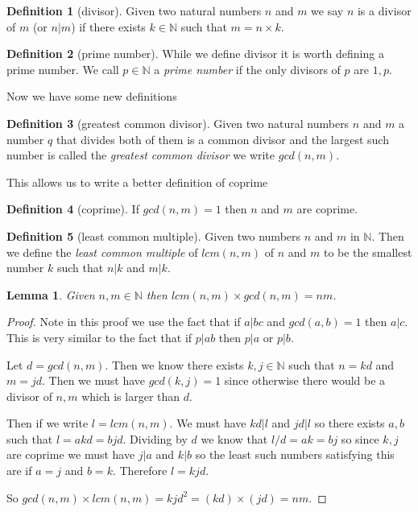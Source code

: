 \documentclass[
]{book}
\newtheorem{lemma}{Lemma}[chapter]
\theoremstyle{definition}
\newtheorem{definition}{Definition}[chapter]
\theoremstyle{definition}
\theoremstyle{definition}
\theoremstyle{definition}
\theoremstyle{remark}
\begin{document}
\begin{definition}[divisor]
Given two natural numbers \(n\) and \(m\) we say \(n\) is a divisor of \(m\) (or \(n|m\)) if there exists \(k \in \mathbb{N}\) such that \(m=n\times k\).
\end{definition}

\begin{definition}[prime number]
While we define divisor it is worth defining a prime number. We call \(p \in \mathbb{N}\) a \emph{prime number} if the only divisors of \(p\) are \(1, p\).
\end{definition}

Now we have some new definitions

\begin{definition}[greatest common divisor]
Given two natural numbers \(n\) and \(m\) a number \(q\) that divides both of them is a common divisor and the largest such number is called the \emph{greatest common divisor} we write \(gcd(n,m)\).
\end{definition}

This allows us to write a better definition of coprime

\begin{definition}[coprime]
If \(gcd(n,m)=1\) then \(n\) and \(m\) are coprime.
\end{definition}

\begin{definition}[least common multiple]
Given two numbers \(n\) and \(m\) in \(\mathbb{N}\). Then we define the \emph{least common multiple} of \(lcm(n,m)\) of \(n\) and \(m\) to be the smallest number \(k\) such that \(n|k\) and \(m|k\).
\end{definition}

\begin{lemma}
Given \(n, m \in \mathbb{N}\) then \(lcm(n,m) \times gcd(n,m) = nm\).
\end{lemma}

\begin{proof}
Note in this proof we use the fact that if \(a|bc\) and \(gcd(a,b) =1\) then \(a|c\). This is very similar to the fact that if \(p|ab\) then \(p|a\) or \(p|b\).

Let \(d = gcd(n,m)\). Then we know there exists \(k, j \in \mathbb{N}\) such that \(n =kd\) and \(m =jd\). Then we must have \(gcd(k,j) =1\) since otherwise there would be a divisor of \(n,m\) which is larger than \(d\).

Then if we write \(l = lcm(n,m)\). We must have \(kd|l\) and \(jd|l\) so there exists \(a, b\) such that \(l=akd=bjd\). Dividing by \(d\) we know that \(l/d = ak = bj\) so since \(k,j\) are coprime we must have \(j|a\) and \(k|b\) so the least such numbers satisfying this are if \(a=j\) and \(b=k\). Therefore \(l=kjd\).

So \(gcd(n,m)\times lcm(n,m) = kjd^2 = (kd)\times (jd) = nm\).
\end{proof}
\end{document}
